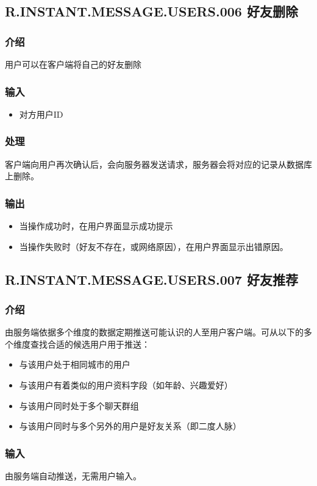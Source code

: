 {
\color{red}
\subsection{R.INSTANT.MESSAGE.USERS.006 好友删除}
\subsubsection{介绍}
用户可以在客户端将自己的好友删除
\subsubsection{输入}
\begin{itemize}
	\item 对方用户ID
\end{itemize}
\subsubsection{处理}
客户端向用户再次确认后，会向服务器发送请求，服务器会将对应的记录从数据库上删除。
\subsubsection{输出}
\begin{itemize}
	\item 当操作成功时，在用户界面显示成功提示
	\item 当操作失败时（好友不存在，或网络原因），在用户界面显示出错原因。
\end{itemize}
\subsection{R.INSTANT.MESSAGE.USERS.007 好友推荐}
\subsubsection{介绍}
由服务端依据多个维度的数据定期推送可能认识的人至用户客户端。可从以下的多个维度查找合适的候选用户用于推送：
\begin{itemize}
	\item 与该用户处于相同城市的用户
	\item 与该用户有着类似的用户资料字段（如年龄、兴趣爱好）
	\item 与该用户同时处于多个聊天群组
	\item 与该用户同时与多个另外的用户是好友关系（即二度人脉）
\end{itemize}
\subsubsection{输入}
由服务端自动推送，无需用户输入。
}

